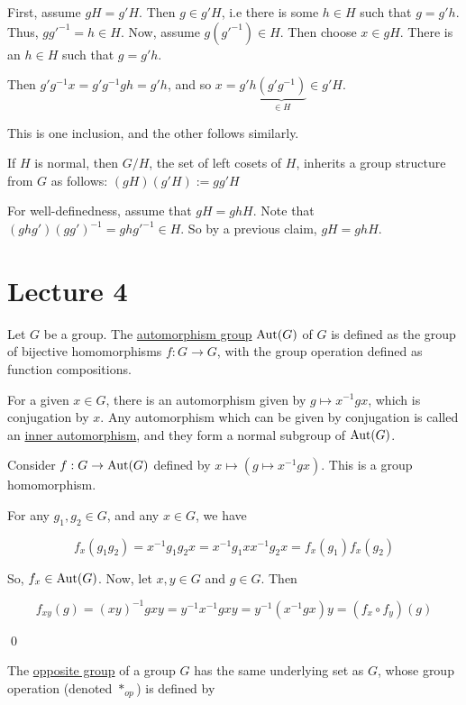 \documentclass[x11names,reqno,14pt]{extarticle}
\begin{document}
\proof

First, assume $gH = g'H$. Then $g \in g'H$, i.e there is some $h \in H$ such that $g = g'h$. Thus, $gg'^{-1} = h \in H$. Now, assume $g(g'^{-1}) \in H$. Then choose $x \in gH$. There is an $h \in H$ such that $g = g'h$. 

Then $g'g^{-1}x = g'g^{-1}gh = g'h$, and so $x = g'h\underbrace{(g'g^{-1})}_{\in H}\in g'H$.

This is one inclusion, and the other follows similarly. 

\claim If $H$ is normal, then $G/H$, the set of left cosets of $H$, inherits a group structure from $G$ as follows: $(gH)(g'H) := gg'H$

\proof

For well-definedness, assume that $gH = ghH$. Note that $(ghg')(gg')^{-1} = ghg'^{-1} \in H$. So by a previous claim, $gH = ghH$.



\section*{Lecture 4}



Let $G$ be a group. The \underline{automorphism group} ${\mathrm{Aut}}(G)$ of $G$ is defined as the group of bijective homomorphisms $f:G\to G$, with the group operation defined as function compositions. 

For a given $x \in G$, there is an automorphism given by $g \mapsto x^{-1}gx$, which is conjugation by $x$. Any automorphism which can be given by conjugation is called an \underline{inner automorphism}, and they form a normal subgroup of ${\mathrm{Aut}}(G)$. 

\claim Consider $f:G\to{\mathrm{Aut}}(G)$ defined by $x \mapsto (g \mapsto x^{-1}gx)$. This is a group homomorphism. 

\proof

For any $g_1, g_2 \in G$, and any $x \in G$, we have

\[
f_x(g_1g_2) = x^{-1}g_1g_2x = x^{-1}g_1xx^{-1}g_2x =f_x(g_1)f_x(g_2)
\]

So, $f_x \in {\mathrm{Aut}}(G)$. Now, let $x, y \in G$ and $g \in G$. Then

\[
f_{xy}(g) = (xy)^{-1}gxy = y^{-1}x^{-1}gxy = y^{-1}(x^{-1}gx)y = (f_x \circ f_y) (g)
\]

\qed


The \underline{opposite group} of a group $G$ has the same underlying set as $G$, whose group operation (denoted $*_{op}$) is defined by
\end{document}
